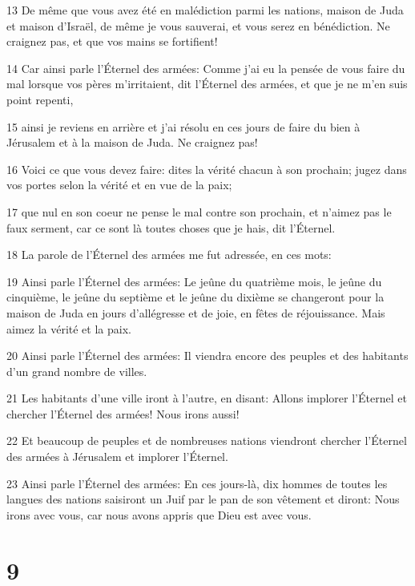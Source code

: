 \par 13 De même que vous avez été en malédiction parmi les nations, maison de Juda et maison d'Israël, de même je vous sauverai, et vous serez en bénédiction. Ne craignez pas, et que vos mains se fortifient!
\par 14 Car ainsi parle l'Éternel des armées: Comme j'ai eu la pensée de vous faire du mal lorsque vos pères m'irritaient, dit l'Éternel des armées, et que je ne m'en suis point repenti,
\par 15 ainsi je reviens en arrière et j'ai résolu en ces jours de faire du bien à Jérusalem et à la maison de Juda. Ne craignez pas!
\par 16 Voici ce que vous devez faire: dites la vérité chacun à son prochain; jugez dans vos portes selon la vérité et en vue de la paix;
\par 17 que nul en son coeur ne pense le mal contre son prochain, et n'aimez pas le faux serment, car ce sont là toutes choses que je hais, dit l'Éternel.
\par 18 La parole de l'Éternel des armées me fut adressée, en ces mots:
\par 19 Ainsi parle l'Éternel des armées: Le jeûne du quatrième mois, le jeûne du cinquième, le jeûne du septième et le jeûne du dixième se changeront pour la maison de Juda en jours d'allégresse et de joie, en fêtes de réjouissance. Mais aimez la vérité et la paix.
\par 20 Ainsi parle l'Éternel des armées: Il viendra encore des peuples et des habitants d'un grand nombre de villes.
\par 21 Les habitants d'une ville iront à l'autre, en disant: Allons implorer l'Éternel et chercher l'Éternel des armées! Nous irons aussi!
\par 22 Et beaucoup de peuples et de nombreuses nations viendront chercher l'Éternel des armées à Jérusalem et implorer l'Éternel.
\par 23 Ainsi parle l'Éternel des armées: En ces jours-là, dix hommes de toutes les langues des nations saisiront un Juif par le pan de son vêtement et diront: Nous irons avec vous, car nous avons appris que Dieu est avec vous.

\chapter{9}

